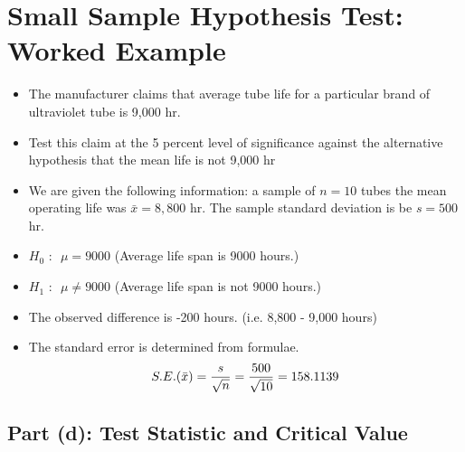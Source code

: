 \documentclass[]{report}
\begin{document}
\section*{Small Sample Hypothesis Test: Worked Example}

\begin{itemize}

\item The manufacturer claims that average tube life for a particular brand of ultraviolet tube
is 9,000 hr. \item Test this claim at the 5 percent level of significance against the alternative hypothesis
that the mean life is not 9,000 hr \item We are given the following information:  a sample of $n = 10$ tubes the mean operating
life was $\bar{x} = 8,800$ hr. The sample standard deviation is be $s = 500$ hr.

\end{itemize}

\begin{framed}

\begin{itemize}
\item $H_0 \mbox{ : } $ $\mu = 9000$ (Average life span is 9000 hours.)
\item $H_1 \mbox{ : } $ $\mu \neq 9000$ (Average life span is not 9000 hours.)
\end{itemize}
\end{framed}
\bigskip
\begin{itemize}
\item The observed difference is -200 hours. (i.e. 8,800 - 9,000 hours)
\item The standard error is determined from formulae.
\[ S.E. (\bar{x}) = {s \over \sqrt{n}} = {500 \over \sqrt{10}}  = 158.1139 \]
\end{itemize}



\subsection*{Part (d): Test Statistic and Critical Value }
\end{document}
